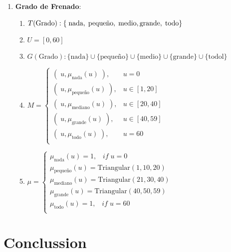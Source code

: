\documentclass[a4paper,10pt,twocolumn]{article}
\begin{document}
\begin{enumerate}
	\item[] \textbf{Grado de Frenado}:
		\begin{enumerate}
			\item[] $T(\text{Grado}): \{ \;\text{nada}, \;\text{peque\~no}, \;\text{medio},\; \\ \text{grande}, \;\text{todo}\}$
			\item[] $U = [0, 60]$
			\item[] $G(\text{Grado}): \{\text{nada}\} \cup \{\text{peque\~no}\} \cup \{\text{medio}\} \cup \{\text{grande}\} \cup \{\text{todol}\}$
			\item[] $M = \begin{cases}
			(\;u, \mu_{\text{nada}} (u) \;), & u = 0 \\
			(\;u, \mu_{\text{peque\~no}} (u) \;), & u \in [1, 20] \\
			(\;u, \mu_{\text{mediano}} (u) \;), & u \in [20, 40] \\
			(\;u, \mu_{\text{grande}} (u) \;), & u \in [40, 59] \\
			(\;u, \mu_{\text{todo}} (u) \;), & u = 60 \\
			\end{cases}$
			\item[] $\mu = \begin{cases}
			\mu_{\text{nada}} (u) = 1, \;\;\; if \;u = 0 \\
			\mu_{\text{peque\~no}} (u) = \text{Triangular} (1, 10, 20) \\
			\mu_{\text{mediano}} (u) = \text{Triangular} (21, 30, 40)\\
			\mu_{\text{grande}} (u) = \text{Triangular} (40, 50, 59)\\
			\mu_{\text{todo}} (u) = 1, \;\;\; if\; u = 60 \\
			\end{cases}$	
		\end{enumerate}	
\end{enumerate}



\section*{Conclussion}\label{sec:con}

\lipsum[9-11]

\begin{thebibliography}{9}
	
\end{thebibliography}

\label{end}
\end{document}
